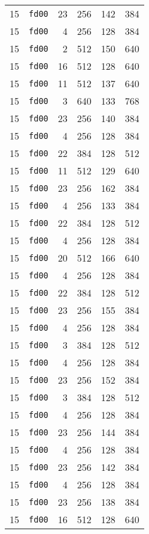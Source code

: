 \documentclass{article}
\begin{document}
\begin{table}[h!]
\begin{tabular}{llrrrl}
    15 & \texttt{fd00} & 23 & 256 & 142 & 384 \\
    15 & \texttt{fd00} & 4 & 256 & 128 & 384 \\
    15 & \texttt{fd00} & 2 & 512 & 150 & 640 \\
    15 & \texttt{fd00} & 16 & 512 & 128 & 640 \\
    15 & \texttt{fd00} & 11 & 512 & 137 & 640 \\
    15 & \texttt{fd00} & 3 & 640 & 133 & 768 \\
    15 & \texttt{fd00} & 23 & 256 & 140 & 384 \\
    15 & \texttt{fd00} & 4 & 256 & 128 & 384 \\
    15 & \texttt{fd00} & 22 & 384 & 128 & 512 \\
    15 & \texttt{fd00} & 11 & 512 & 129 & 640 \\
    15 & \texttt{fd00} & 23 & 256 & 162 & 384 \\
    15 & \texttt{fd00} & 4 & 256 & 133 & 384 \\
    15 & \texttt{fd00} & 22 & 384 & 128 & 512 \\
    15 & \texttt{fd00} & 4 & 256 & 128 & 384 \\
    15 & \texttt{fd00} & 20 & 512 & 166 & 640 \\
    15 & \texttt{fd00} & 4 & 256 & 128 & 384 \\
    15 & \texttt{fd00} & 22 & 384 & 128 & 512 \\
    15 & \texttt{fd00} & 23 & 256 & 155 & 384 \\
    15 & \texttt{fd00} & 4 & 256 & 128 & 384 \\
    15 & \texttt{fd00} & 3 & 384 & 128 & 512 \\
    15 & \texttt{fd00} & 4 & 256 & 128 & 384 \\
    15 & \texttt{fd00} & 23 & 256 & 152 & 384 \\
    15 & \texttt{fd00} & 3 & 384 & 128 & 512 \\
    15 & \texttt{fd00} & 4 & 256 & 128 & 384 \\
    15 & \texttt{fd00} & 23 & 256 & 144 & 384 \\
    15 & \texttt{fd00} & 4 & 256 & 128 & 384 \\
    15 & \texttt{fd00} & 23 & 256 & 142 & 384 \\
    15 & \texttt{fd00} & 4 & 256 & 128 & 384 \\
    15 & \texttt{fd00} & 23 & 256 & 138 & 384 \\
    15 & \texttt{fd00} & 16 & 512 & 128 & 640 \\

\end{tabular}
\end{table}
\end{document}
